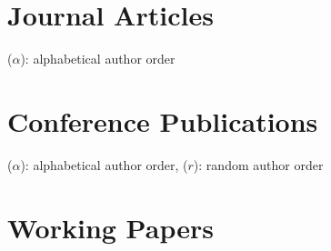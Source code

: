 \documentclass{article}
\begin{document}
	\section{Journal Articles}
	
	\renewcommand{\labelenumi}{J\theenumi.}
	{\footnotesize($\alpha$): alphabetical author order}
	
%        
%    
%	
	
    \begin{etaremune}
    [itemsep=0.2ex,
    	leftmargin=4.8ex]
        
    \end{etaremune}
    
    
    
	

    \section{Conference Publications}
    {\footnotesize($\alpha$): alphabetical author order, ($r$): random author order}
    
    \begin{etaremune}
    	[itemsep=0.2ex,
    	leftmargin=4.8ex]
    	\renewcommand{\labelenumi}{C\theenumi.}
        
    \end{etaremune}
    
    \section{Working Papers}
    \begin{etaremune}
    	[itemsep=0.2ex,
    	leftmargin=4.8ex]
    	\renewcommand{\labelenumi}{W\theenumi.}
        
    \end{etaremune}
    
     
    
\end{document}
